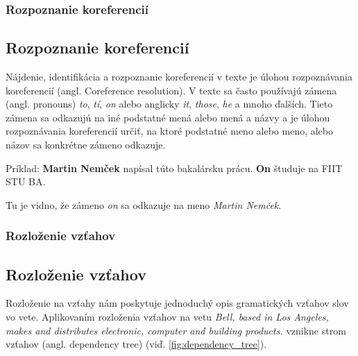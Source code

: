 {
	\subsubsection{Rozpoznanie koreferencií}
}
{
	\subsection{Rozpoznanie koreferencií}
}
\label{subsubsec:corefparsing}
Nájdenie, identifikácia a rozpoznanie koreferencií v texte je úlohou rozpoznávania koreferencií (angl. Coreference resolution). V texte sa často používajú zámena (angl. pronouns) \textit{to}, \textit{tí}, \textit{on} alebo anglicky \textit{it}, \textit{those}, \textit{he} a mnoho ďalších. Tieto zámena sa odkazujú na iné podstatné mená alebo mená a názvy a je úlohou rozpoznávania koreferencií určiť, na ktoré podstatné meno alebo meno, alebo názov sa konkrétne zámeno odkazuje.

Príklad:
\textbf{Martin Nemček} napísal túto bakalársku prácu. \textbf{On} študuje na FIIT STU BA.

Tu je vidno, že zámeno \textit{on} sa odkazuje na meno \textit{Martin Nemček}.

{
	\subsubsection{Rozloženie vzťahov}
}
{
	\subsection{Rozloženie vzťahov}
}
\label{subsubsec:dependencyparsing}
Rozloženie na vzťahy nám poskytuje jednoduchý opis gramatických vzťahov slov vo vete. Aplikovaním rozloženia vzťahov na vetu \textit{Bell, based in Los
Angeles, makes and distributes electronic, computer and building products.
} vznikne strom vzťahov (angl. dependency tree) (viď. \ref{fig:dependency_tree}).

